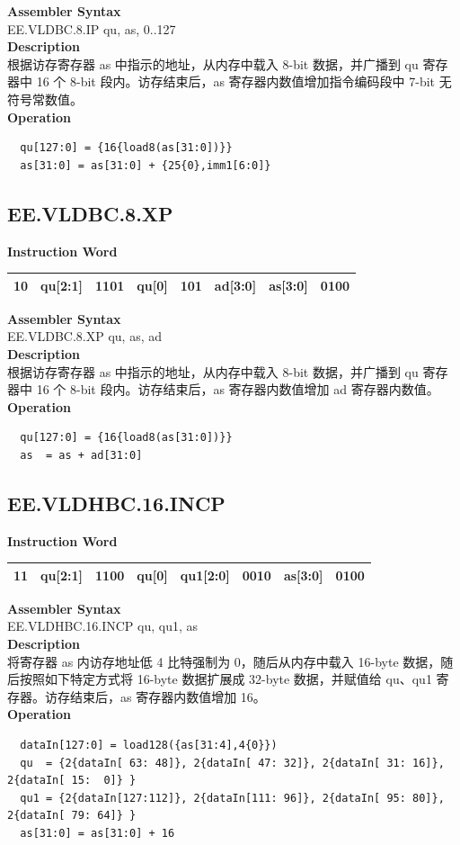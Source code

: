 \textbf{Assembler Syntax} \\
EE.VLDBC.8.IP qu, as, 0..127 \\
\textbf{Description} \\
根据访存寄存器 as 中指示的地址，从内存中载入 8-bit 数据，并广播到 qu 寄存器中 16 个 8-bit 段内。访存结束后，as 寄存器内数值增加指令编码段中 7-bit 无符号常数值。\\
\textbf{Operation}
\begin{lstlisting}
  qu[127:0] = {16{load8(as[31:0])}}
  as[31:0] = as[31:0] + {25{0},imm1[6:0]}
\end{lstlisting}

\clearpage
\subsection{EE.VLDBC.8.XP}\label{instruction:EEVLDBC8XP}
\setlength\tabcolsep{6pt}
\textbf{Instruction Word} \\
\begin{tabular}{|c|c|c|c|c|c|c|c|}
	\hline
	10 & qu[2:1] & 1101 & qu[0] & 101 & ad[3:0] & as[3:0] & 0100 \\
	\hline
\end{tabular}

\textbf{Assembler Syntax} \\
EE.VLDBC.8.XP qu, as, ad \\
\textbf{Description} \\
根据访存寄存器 as 中指示的地址，从内存中载入 8-bit 数据，并广播到 qu 寄存器中 16 个 8-bit 段内。访存结束后，as 寄存器内数值增加 ad 寄存器内数值。\\
\textbf{Operation}
\begin{lstlisting}
  qu[127:0] = {16{load8(as[31:0])}}
  as  = as + ad[31:0]
\end{lstlisting}

\clearpage
\subsection{EE.VLDHBC.16.INCP}\label{instruction:EEVLDHBC16INCP}
\setlength\tabcolsep{6pt}
\textbf{Instruction Word} \\
\begin{tabular}{|c|c|c|c|c|c|c|c|}
	\hline
	11 & qu[2:1] & 1100 & qu[0] & qu1[2:0] & 0010 & as[3:0] & 0100 \\
	\hline
\end{tabular}

\textbf{Assembler Syntax} \\
EE.VLDHBC.16.INCP qu, qu1, as \\
\textbf{Description} \\
将寄存器 as 内访存地址低 4 比特强制为 0，随后从内存中载入 16-byte 数据，随后按照如下特定方式将 16-byte 数据扩展成 32-byte 数据，并赋值给 qu、qu1 寄存器。访存结束后，as 寄存器内数值增加 16。\\
\textbf{Operation}
\begin{lstlisting}
  dataIn[127:0] = load128({as[31:4],4{0}})
  qu  = {2{dataIn[ 63: 48]}, 2{dataIn[ 47: 32]}, 2{dataIn[ 31: 16]}, 2{dataIn[ 15:  0]} }
  qu1 = {2{dataIn[127:112]}, 2{dataIn[111: 96]}, 2{dataIn[ 95: 80]}, 2{dataIn[ 79: 64]} }
  as[31:0] = as[31:0] + 16
\end{lstlisting}

